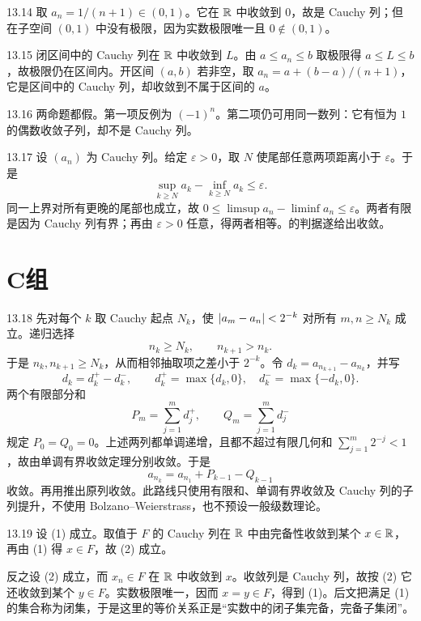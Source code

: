 \begin{solution}{13.14}
取 \(a_n=1/(n+1)\in(0,1)\)。它在 \(\mathbb{R}\) 中收敛到 \(0\)，故是 Cauchy 列；但在子空间 \((0,1)\) 中没有极限，因为实数极限唯一且 \(0\notin(0,1)\)。
\end{solution}

\begin{solution}{13.15}
闭区间中的 Cauchy 列在 \(\mathbb{R}\) 中收敛到 \(L\)。由
\(a\le a_n\le b\) 取极限得 \(a\le L\le b\)，故极限仍在区间内。开区间 \((a,b)\) 若非空，取
\(a_n=a+(b-a)/(n+1)\)，它是区间中的 Cauchy 列，却收敛到不属于区间的 \(a\)。
\end{solution}

\begin{solution}{13.16}
两命题都假。第一项反例为 \((-1)^n\)。第二项仍可用同一数列：它有恒为 \(1\) 的偶数收敛子列，却不是 Cauchy 列。
\end{solution}

\begin{solution}{13.17}
设 \((a_n)\) 为 Cauchy 列。给定 \(\varepsilon>0\)，取 \(N\) 使尾部任意两项距离小于 \(\varepsilon\)。于是
\[
 \sup_{k\ge N}a_k-\inf_{k\ge N}a_k\le\varepsilon.
\]
同一上界对所有更晚的尾部也成立，故
\(0\le\limsup a_n-\liminf a_n\le\varepsilon\)。两者有限是因为 Cauchy 列有界；再由 \(\varepsilon>0\) 任意，得两者相等。的判据遂给出收敛。
\end{solution}

\section*{C组}

\begin{solution}{13.18}
先对每个 \(k\) 取 Cauchy 起点 \(N_k\)，使
\(\left|a_m-a_n\right|<2^{-k}\) 对所有 \(m,n\ge N_k\) 成立。递归选择
\[
 n_k\ge N_k,\qquad n_{k+1}>n_k.
\]
于是 \(n_k,n_{k+1}\ge N_k\)，从而相邻抽取项之差小于
\(2^{-k}\)。令
\(d_k=a_{n_{k+1}}-a_{n_k}\)，并写
\[
 d_k=d_k^+-d_k^-,
 \qquad d_k^+=\max\{d_k,0\},\quad
 d_k^-=\max\{-d_k,0\}.
\]
两个有限部分和
\[
 P_m=\sum_{j=1}^m d_j^+,\qquad
 Q_m=\sum_{j=1}^m d_j^-
\]
规定 \(P_0=Q_0=0\)。上述两列都单调递增，且都不超过有限几何和
\(\sum_{j=1}^m2^{-j}<1\)，故由单调有界收敛定理分别收敛。于是
\[
 a_{n_k}=a_{n_1}+P_{k-1}-Q_{k-1}
\]
收敛。再用推出原列收敛。此路线只使用有限和、单调有界收敛及 Cauchy 列的子列提升，不使用 Bolzano--Weierstrass，也不预设一般级数理论。
\end{solution}

\begin{solution}{13.19}
设 (1) 成立。取值于 \(F\) 的 Cauchy 列在 \(\mathbb{R}\) 中由完备性收敛到某个
\(x\in\mathbb{R}\)，再由 (1) 得 \(x\in F\)，故 (2) 成立。

反之设 (2) 成立，而 \(x_n\in F\) 在 \(\mathbb{R}\) 中收敛到 \(x\)。收敛列是
Cauchy 列，故按 (2) 它还收敛到某个 \(y\in F\)。实数极限唯一，因而
\(x=y\in F\)，得到 (1)。后文把满足 (1) 的集合称为闭集，于是这里的等价关系正是“实数中的闭子集完备，完备子集闭”。
\end{solution}


